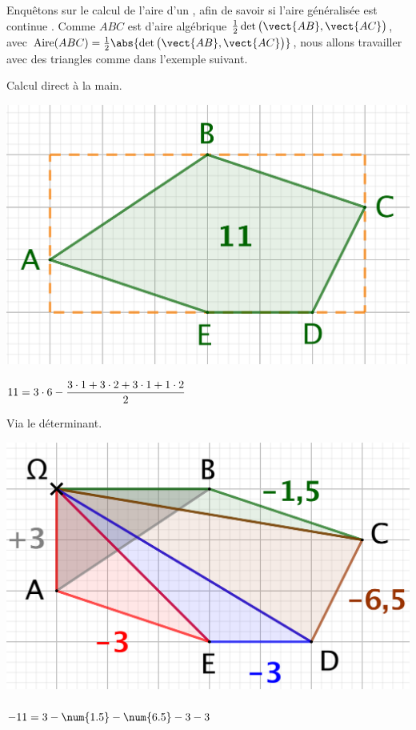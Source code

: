 

Enquêtons sur le calcul de l'aire d'un \ngone, afin de savoir si l'aire généralisée est \og continue \fg. 
Comme $ABC$ est d'aire algébrique $\frac12 \det \big( \vect{AB} , \vect{AC} \big)$, avec $\area{ABC} = \frac12 \abs{ \det \big( \vect{AB} , \vect{AC} \big) }$, nous allons travailler avec des triangles comme dans l'exemple suivant.


\begin{multicols}{2}
	\small\itshape
    \begin{center}
		Calcul direct à la main.

		\smallskip

        \includegraphics[scale=.35]{content/polygon/at-least-one/convex-1.png}

       	\smallskip

		$11 = 3 \cdot 6 - \dfrac{3 \cdot 1 + 3 \cdot 2 + 3 \cdot 1 + 1 \cdot 2}{2} \vphantom{\dfrac{2^M}2}$
    \end{center}

	\columnbreak

    \begin{center}
		Via le déterminant.

		\smallskip

        \includegraphics[scale=.35]{content/polygon/at-least-one/convex-2.png}

       	\smallskip

		$- 11 = 3 - \num{1.5} - \num{6.5} - 3 - 3 \vphantom{\dfrac{2^M}2}$
    \end{center}
\end{multicols}


